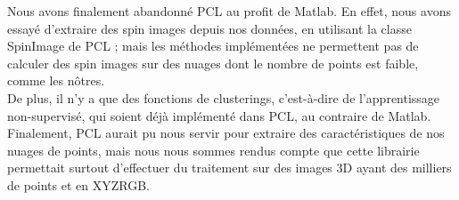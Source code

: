 	Nous avons finalement abandonné PCL au profit de Matlab. En effet, nous avons essayé d'extraire des spin images depuis nos données, en utilisant la classe SpinImage de PCL ; mais les méthodes implémentées ne permettent pas de calculer des spin images sur des nuages dont le nombre de points est faible, comme les nôtres.\\

	De plus, il n'y a que des fonctions de clusterings, c'est-à-dire de l'apprentissage non-supervisé, qui soient déjà implémenté dans PCL, au contraire de Matlab.\\

	Finalement, PCL aurait pu nous servir pour extraire des caractéristiques de nos nuages de points, mais nous nous sommes rendus compte que cette librairie permettait surtout d'effectuer du traitement sur des images 3D ayant des milliers de points et en XYZRGB.\\

